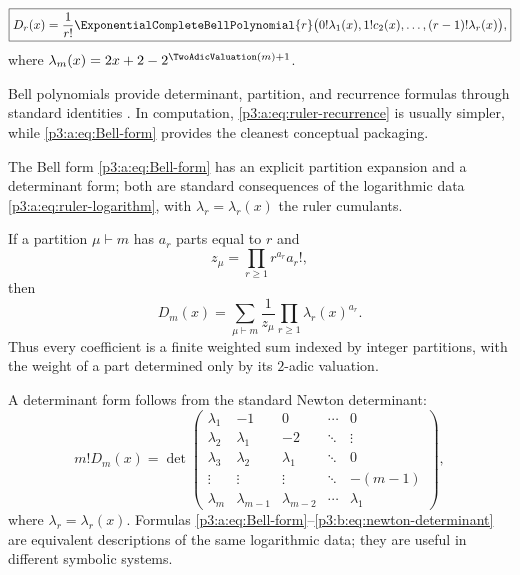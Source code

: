 \documentclass[11pt,oneside]{article}
\numberwithin{equation}{section}
\theoremstyle{definition}
\theoremstyle{remark}
\begin{document}
\begin{corollary}
\begin{equation}
 \boxed{
 D_r(x)=\frac1{r!}
 \ExponentialCompleteBellPolynomial{r}\bigl(0!\lambda_1(x),1!c_2(x),\ldots,(r-1)!\lambda_r(x)\bigr),}
 \label{p3:a:eq:Bell-form}
\end{equation}
where \(\lambda_m(x)=2x+2-2^{\TwoAdicValuation(m)+1}\).
\end{corollary}

Bell polynomials provide determinant, partition, and recurrence formulas
through standard identities \cite{p3:comtet}.  In computation,
\eqref{p3:a:eq:ruler-recurrence} is usually simpler, while \eqref{p3:a:eq:Bell-form}
provides the cleanest conceptual packaging.

The Bell form \eqref{p3:a:eq:Bell-form} has an explicit partition expansion and
a determinant form; both are standard consequences of the logarithmic data
\eqref{p3:a:eq:ruler-logarithm}, with $\lambda_r=\lambda_r(x)$ the ruler
cumulants.

If a partition $\mu\vdash m$ has $a_r$ parts equal to $r$ and
\[
 z_\mu=\prod_{r\ge1}r^{a_r}a_r!,
\]
then
\begin{equation}
 D_m(x)=\sum_{\mu\vdash m}
  \frac{1}{z_\mu}\prod_{r\ge1}\lambda_r(x)^{a_r}.
 \label{p3:b:eq:partition-formula}
\end{equation}
Thus every coefficient is a finite weighted sum indexed by integer
partitions, with the weight of a part determined only by its $2$-adic
valuation.

A determinant form follows from the standard Newton determinant:
\begin{equation}
 m!D_m(x)=
 \det\!\begin{pmatrix}
 \lambda_1 & -1 & 0 & \cdots & 0\\
 \lambda_2 & \lambda_1 & -2 & \ddots & \vdots\\
 \lambda_3 & \lambda_2 & \lambda_1 & \ddots & 0\\
 \vdots & \vdots & \vdots & \ddots & -(m-1)\\
 \lambda_m & \lambda_{m-1} & \lambda_{m-2} & \cdots & \lambda_1
 \end{pmatrix},
 \label{p3:b:eq:newton-determinant}
\end{equation}
where $\lambda_r=\lambda_r(x)$.  Formulas
\eqref{p3:a:eq:Bell-form}--\eqref{p3:b:eq:newton-determinant} are equivalent descriptions
of the same logarithmic data; they are useful in different symbolic systems.
\end{document}
